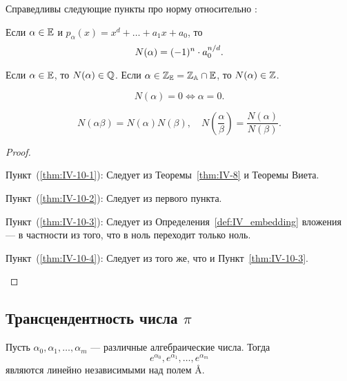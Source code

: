 \begin{ntheorem}
\label{thm:IV-10}
    Справедливы следующие пункты про норму относительно \EE:
    \begin{statesp}
        \item
        \label{thm:IV-10-1}
            Если $\alpha \in \mathbb{E}$ и $p_{\alpha}(x) = x^d + \dots + a_1 x + a_0$, то
            \[
                N(\alpha) = (-1)^n \cdot a_0^{n / d}.
            \]
        \item
        \label{thm:IV-10-2}
            Если $\alpha \in \mathbb{E}$, то $N(\alpha) \in \mathbb{Q}$. 
            Если $\alpha \in \mathbb{Z}_{\mathbb{E}} = \mathbb{Z}_{\mathbb{A}} \cap \mathbb{E}$, то $N(\alpha) \in \mathbb{Z}$.
        \item
        \label{thm:IV-10-3}
            \[
                N(\alpha) = 0 \Leftrightarrow \alpha = 0.
            \]
        \item
        \label{thm:IV-10-4}
            \[
                N(\alpha\beta) = N(\alpha)N(\beta), \quad N\left( \frac{\alpha}{\beta} \right) = \frac{N(\alpha)}{N(\beta)}.
            \]
    \end{statesp}
\end{ntheorem}
\begin{proof}
\hfill
    \begin{statesp}
        \item[Пункт~(\ref{thm:IV-10-1}):]
            Следует из Теоремы~\ref{thm:IV-8} и Теоремы Виета.
        \item[Пункт~(\ref{thm:IV-10-2}):]
            Следует из первого пункта.
        \item[Пункт~(\ref{thm:IV-10-3}):]
            Следует из Определения~\ref{def:IV_embedding} вложения --- в частности из того, что в ноль переходит только ноль.
        \item[Пункт~(\ref{thm:IV-10-4}):]
            Следует из того же, что и Пункт~\ref{thm:IV-10-3}.
    \end{statesp}
\end{proof}


\subsection{\texorpdfstring{Трансцендентность числа $\pi$}{Трансцендентность числа π}}
\label{subsec:IV-5}

\begin{ntheorem}
\label{thm:IV-11}
    Пусть $\alpha_0, \alpha_1, \dots, \alpha_m$ --- различные алгебраические числа. Тогда
    \[
        e^{\alpha_0}, e^{\alpha_1}, \dots, e^{\alpha_m}
    \]
    являются линейно независимыми над полем \AA.
\end{ntheorem}


